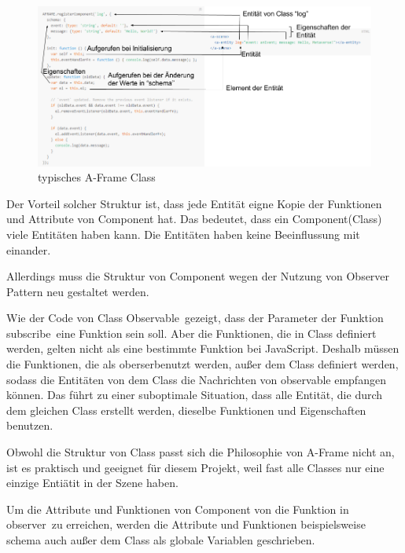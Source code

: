 \begin{figure}[ht]
\vspace*{0.3cm}
\centering
\includegraphics[width=\textwidth]{images/aframeClass.png}
\caption[typisches A-Frame Class]{typisches A-Frame Class}
\label{fig:aframeClass} 
\end{figure}
 
 Der Vorteil solcher Struktur ist, dass jede Entität eigne Kopie der Funktionen und Attribute von Component hat. Das bedeutet, dass ein Component(Class) viele Entitäten haben kann. Die Entitäten haben keine Beeinflussung mit einander.
 
 Allerdings muss die Struktur von Component wegen der Nutzung von Observer Pattern neu gestaltet werden.
 
 Wie der Code von Class \glqq Observable\grqq\ gezeigt, dass der Parameter der Funktion \glqq subscribe\grqq\ eine Funktion sein soll. Aber die Funktionen, die in Class definiert werden, gelten nicht als eine bestimmte Funktion bei JavaScript. Deshalb müssen die Funktionen, die als \glqq oberser\grqq benutzt werden, außer dem Class definiert werden, sodass die Entitäten von dem Class die Nachrichten von observable empfangen können. Das führt zu einer suboptimale Situation, dass alle Entität, die durch dem gleichen Class erstellt werden, dieselbe Funktionen und Eigenschaften benutzen.
 
 Obwohl die Struktur von Class passt sich die Philosophie von A-Frame nicht an, ist es praktisch und geeignet für diesem Projekt, weil fast alle Classes nur eine einzige Entiätit in der Szene haben.
 
 Um die Attribute und Funktionen von Component von die Funktion in \glqq observer\grqq\ zu erreichen, werden die Attribute und Funktionen beispielsweise schema auch außer dem Class als globale Variablen geschrieben.
 
